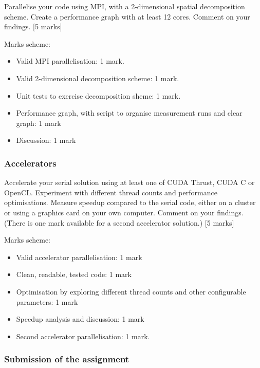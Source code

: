 Parallelise your code using MPI, with a 2-dimensional spatial
decomposition scheme. Create a performance graph with at least 12 cores.
Comment on your findings. {[}5 marks{]}

Marks scheme:

\begin{itemize}
\itemsep1pt\parskip0pt
\item
  Valid MPI parallelisation: 1 mark.
\item
  Valid 2-dimensional decomposition scheme: 1 mark.
\item
  Unit tests to exercise decomposition sheme: 1 mark.
\item
  Performance graph, with script to organise measurement runs and clear
  graph: 1 mark
\item
  Discussion: 1 mark
\end{itemize}

\subsubsection{Accelerators}\label{accelerators-1}

Accelerate your serial solution using at least one of CUDA Thrust, CUDA
C or OpenCL. Experiment with different thread counts and performance
optimisations. Measure speedup compared to the serial code, either on a
cluster or using a graphics card on your own computer. Comment on your
findings. (There is one mark available for a second accelerator
solution.) {[}5 marks{]}

Marks scheme:

\begin{itemize}
\itemsep1pt\parskip0pt
\item
  Valid accelerator parallelisation: 1 mark
\item
  Clean, readable, tested code: 1 mark
\item
  Optimisation by exploring different thread counts and other
  configurable parameters: 1 mark
\item
  Speedup analysis and discussion: 1 mark
\item
  Second accelerator parallelisation: 1 mark.
\end{itemize}

\subsubsection{Submission of the
assignment}\label{submission-of-the-assignment}

